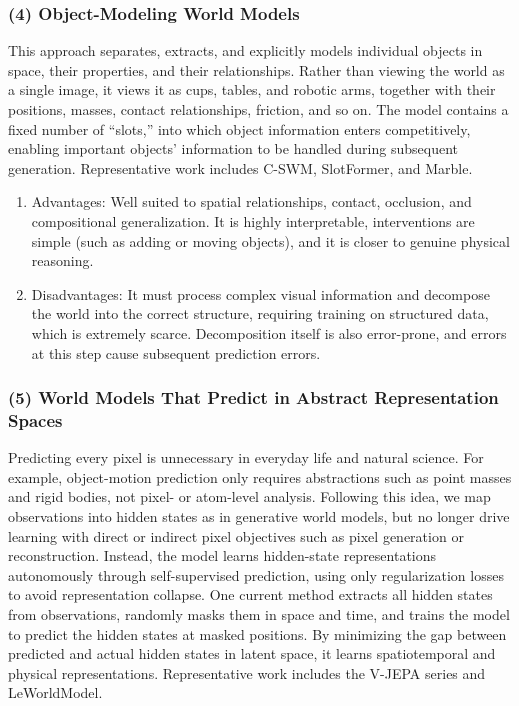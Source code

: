 \hypertarget{object-modeling-world-models}{%
\subsubsection{(4) Object-Modeling World Models}\label{object-modeling-world-models}}

This approach separates, extracts, and explicitly models individual objects in space, their properties, and their relationships. Rather than viewing the world as a single image, it views it as cups, tables, and robotic arms, together with their positions, masses, contact relationships, friction, and so on. The model contains a fixed number of ``slots,'' into which object information enters competitively, enabling important objects' information to be handled during subsequent generation. Representative work includes C-SWM, SlotFormer, and Marble.

\begin{enumerate}
\def\labelenumi{\arabic{enumi}.}
\item
  Advantages: Well suited to spatial relationships, contact, occlusion, and compositional generalization. It is highly interpretable, interventions are simple (such as adding or moving objects), and it is closer to genuine physical reasoning.
\item
  Disadvantages: It must process complex visual information and decompose the world into the correct structure, requiring training on structured data, which is extremely scarce. Decomposition itself is also error-prone, and errors at this step cause subsequent prediction errors.
\end{enumerate}

\hypertarget{world-models-that-predict-in-abstract-representation-spaces}{%
\subsubsection{(5) World Models That Predict in Abstract Representation Spaces}\label{world-models-that-predict-in-abstract-representation-spaces}}

Predicting every pixel is unnecessary in everyday life and natural science. For example, object-motion prediction only requires abstractions such as point masses and rigid bodies, not pixel- or atom-level analysis. Following this idea, we map observations into hidden states as in generative world models, but no longer drive learning with direct or indirect pixel objectives such as pixel generation or reconstruction. Instead, the model learns hidden-state representations autonomously through self-supervised prediction, using only regularization losses to avoid representation collapse. One current method extracts all hidden states from observations, randomly masks them in space and time, and trains the model to predict the hidden states at masked positions. By minimizing the gap between predicted and actual hidden states in latent space, it learns spatiotemporal and physical representations. Representative work includes the V-JEPA series and LeWorldModel.

